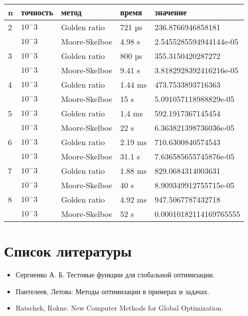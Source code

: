 \documentclass{article}
\begin{document}
    \begin{tabular}{ |p{2cm}|p{2cm}|p{3cm}|p{2cm}|p{4cm}|  }
        \hline
        n & точность & метод         & время   & значение               \\
        \hline
        2 & $10^-3$  & Golden ratio  & 721 µs  & 236.8766946858181      \\\cline{2-5}
        & $10^-3$  & Moore-Skelboe & 4.98 s  & 2.5455285594944144e-05 \\
        \hline
        3 & $10^-3$  & Golden ratio  & 800 µs  & 355.3150420287272      \\\cline{2-5}
        & $10^-3$  & Moore-Skelboe & 9.41 s  & 3.8182928392416216e-05 \\
        \hline
        4 & $10^-3$  & Golden ratio  & 1.44 ms & 473.7533893716363      \\\cline{2-5}
        & $10^-3$  & Moore-Skelboe & 15 s    & 5.091057118988829e-05  \\
        \hline
        5 & $10^-3$  & Golden ratio  & 1.4 ms  & 592.1917367145454      \\\cline{2-5}
        & $10^-3$  & Moore-Skelboe & 22 s    & 6.363821398736036e-05  \\
        \hline
        6 & $10^-3$  & Golden ratio  & 2.19 ms & 710.6300840574543      \\\cline{2-5}
        & $10^-3$  & Moore-Skelboe & 31.1 s  & 7.636585655745876e-05  \\
        \hline
        7 & $10^-3$  & Golden ratio  & 1.88 ms & 829.0684314003631      \\\cline{2-5}
        & $10^-3$  & Moore-Skelboe & 40 s    & 8.909349912755715e-05  \\
        \hline
        8 & $10^-3$  & Golden ratio  & 4.92 ms & 947.5067787432718      \\\cline{2-5}
        & $10^-3$  & Moore-Skelboe & 52 s    & 0.00010182114169765555 \\
        \hline

    \end{tabular}












    \newpage


    \section{Список литературы}
    \begin{itemize}
        \item Сергиенко А. Б. Тестовые функции для глобальной оптимизации.
        \item Пантелеев, Летова: Методы оптимизации в примерах и задачах.
        \item Ratschek, Rokne. New Computer Methods for Global Optimization.
    \end{itemize}
\end{document}
